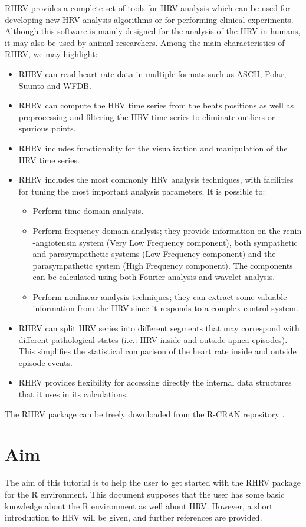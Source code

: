 RHRV provides a complete set of
tools for \gls{HRV} analysis which can be used for developing new \gls{HRV} analysis algorithms or for performing clinical experiments. Although this software is 
mainly designed for the analysis of the \gls{HRV} in humans, it may also be used by animal researchers. Among the main characteristics of RHRV, we may highlight:
\begin{itemize}
\item RHRV can read heart rate data in multiple formats such as ASCII, Polar, Suunto and WFDB.
\item RHRV can compute the \gls{HRV} time series from the beats positions as well as preprocessing  and filtering the \gls{HRV} time series to eliminate outliers or spurious points.
\item RHRV includes functionality for the visualization and manipulation of the \gls{HRV} time series.
\item RHRV includes the most commonly \gls{HRV} analysis techniques, with facilities for tuning the most important analysis parameters. It is possible to:
	 \begin{itemize}
	 	\item Perform time-domain analysis.
		\item Perform frequency-domain analysis; they provide information on the renin	-angiotensin system (Very Low Frequency component), both sympathetic and
		parasympathetic systems (Low Frequency component) and the parasympathetic system (High Frequency component). The components can be calculated using both Fourier analysis
		and wavelet analysis.
		\item Perform nonlinear analysis techniques; they can extract some valuable information from the \gls{HRV} since it responds to a complex control
		system.
	 \end{itemize}
\item RHRV can	 split \gls{HRV} series into different segments that may correspond with different pathological states (i.e.: \gls{HRV} inside and outside apnea episodes). This simplifies
the statistical comparison of the heart rate inside and outside episode events.
\item RHRV provides flexibility for accessing directly the internal data structures that it uses in its calculations.
\end{itemize}

The RHRV package can be freely downloaded from the R-CRAN repository \cite{cran}. \\
\section{Aim} The aim of this tutorial is to help the user to get started with the RHRV package for the R environment. This document supposes that the user has some basic knowledge about the R environment as well about \gls{HRV}. However, a short introduction to \gls{HRV} will be given, and further references are provided.

